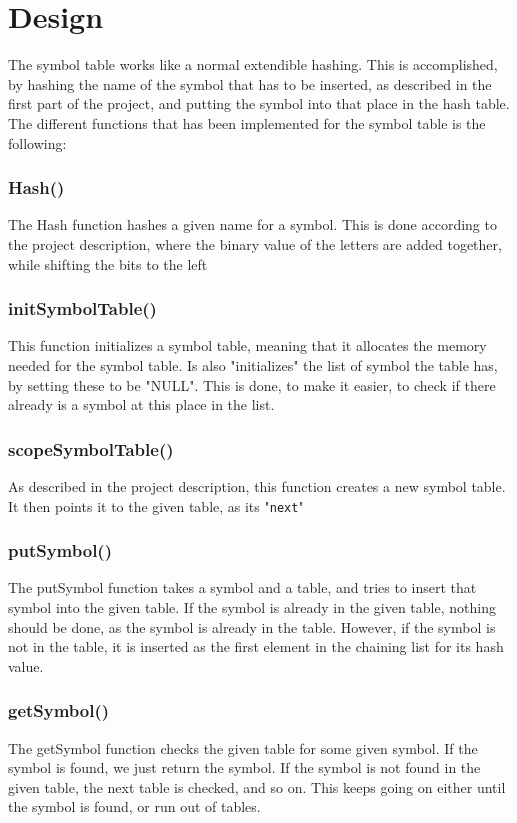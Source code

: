 \documentclass[a4paper,10pt,titlepage]{report}
\begin{document}
\section{Design}
The symbol table works like a normal extendible hashing. This is accomplished, by hashing the name of the symbol that has to be inserted, as described in the first part of the project, and putting the symbol into that place in the hash table.\\
The different functions that has been implemented for the symbol table is the following:
\subsubsection{Hash()}
The Hash function hashes a given name for a symbol. This is done according to the project description, where the binary value of the letters are added together, while shifting the bits to the left

\subsubsection{initSymbolTable()}
This function initializes a symbol table, meaning that it allocates the memory needed for the symbol table. Is also "initializes" the list of symbol the table has, by setting these to be "NULL". This is done, to make it easier, to check if there already is a symbol at this place in the list.

\subsubsection{scopeSymbolTable()}
As described in the project description, this function creates a new symbol table. It then points it to the given table, as its "\verb!next!"

\subsubsection{putSymbol()}
The putSymbol function takes a symbol and a table, and tries to insert that symbol into the given table. If the symbol is already in the given table, nothing should be done, as the symbol is already in the table. However, if the symbol is not in the table, it is inserted as the first element in the chaining list for its hash value.

\subsubsection{getSymbol()}
The getSymbol function checks the given table for some given symbol. If the symbol is found, we just return the symbol. If the symbol is not found in the given table, the next table is checked, and so on. This keeps going on either until the symbol is found, or run out of tables.
\end{document}
